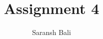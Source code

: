 \documentclass[journal,12pt,twocolumn]{IEEEtran}
\begin{document}
\makeatletter
{}
\makeatother
\let\StandardTheFigure\thefigure
\let\vec\mathbf
\renewcommand{\thefigure}{\theproblem}
\def\putbox#1#2#3{\makebox[0in][l]{\makebox[#1][l]{}\raisebox{\baselineskip}[0in][0in]{\raisebox{#2}[0in][0in]{#3}}}}
     \def\rightbox#1{\makebox[0in][r]{#1}}
     \def\centbox#1{\makebox[0in]{#1}}
     \def\topbox#1{\raisebox{-\baselineskip}[0in][0in]{#1}}
     \def\midbox#1{\raisebox{-0.5\baselineskip}[0in][0in]{#1}}
\vspace{3cm}
\title{Assignment 4}
\author{Saransh Bali}
%
%
%
% 
%
\end{document}
